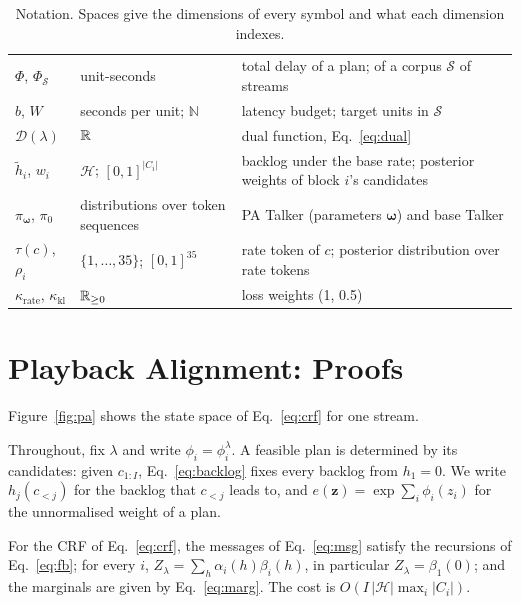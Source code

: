 \begin{table}[t]
\begin{tabular}{@{}l>{\raggedright\arraybackslash}p{4.2cm}>{\raggedright\arraybackslash}p{8.9cm}@{}}
$\Phi$, $\Phi_\mathcal{S}$ & unit-seconds & total delay of a plan; of a corpus $\mathcal{S}$ of streams \\
$b$, $W$ & seconds per unit; $\mathbb{N}$ & latency budget; target units in $\mathcal{S}$ \\
$\mathcal{D}(\lambda)$ & $\mathbb{R}$ & dual function, Eq.~\eqref{eq:dual} \\
$\tilde{h}_i$, $w_i$ & $\mathcal{H}$; $[0,1]^{|C_i|}$ & backlog under the base rate; posterior weights of block $i$'s candidates \\
$\pi_{\bm{\omega}}$, $\pi_0$ & distributions over token sequences & PA Talker (parameters $\bm{\omega}$) and base Talker \\
$\tau(c)$, $\rho_i$ & $\{1,\dots,35\}$; $[0,1]^{35}$ & rate token of $c$; posterior distribution over rate tokens \\
$\kappa_\text{rate}$, $\kappa_\text{kl}$ & $\mathbb{R}_{\ge0}$ & loss weights (1, 0.5) \\
\bottomrule
\end{tabular}
\caption{Notation. Spaces give the dimensions of every symbol and what each dimension indexes.}
\label{tab:notation}
\end{table}


\section{Playback Alignment: Proofs}
\label{app:proofs}



Figure~\ref{fig:pa} shows the state space of Eq.~\eqref{eq:crf} for one stream.

Throughout, fix $\lambda$ and write $\phi_i=\phi^\lambda_i$. A feasible plan is determined by its candidates: given
$c_{1:I}$, Eq.~\eqref{eq:backlog} fixes every backlog from $h_1=0$. We write $h_j(c_{<j})$ for the backlog that
$c_{<j}$ leads to, and $e(\bm{z})=\exp\sum_i\phi_i(z_i)$ for the unnormalised weight of a plan.

\begin{proposition}
\label{prop:fb}
For the CRF of Eq.~\eqref{eq:crf}, the messages of Eq.~\eqref{eq:msg} satisfy the recursions of Eq.~\eqref{eq:fb};
for every $i$, $Z_\lambda=\sum_h\alpha_i(h)\beta_i(h)$, in particular $Z_\lambda=\beta_1(0)$; and the marginals are given
by Eq.~\eqref{eq:marg}. The cost is $O(I\,|\mathcal{H}|\max_i|C_i|)$.
\end{proposition}

